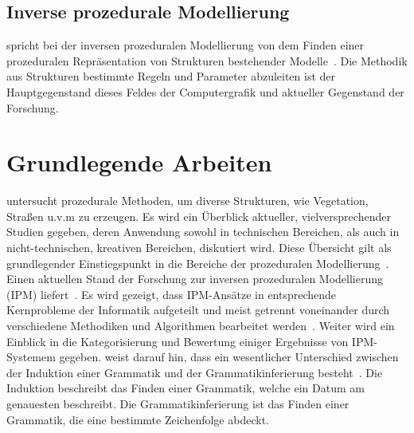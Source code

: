 \subsection*{Inverse prozedurale Modellierung}
\citeauthor{aliaga_2016} spricht bei der inversen prozeduralen Modellierung von dem Finden einer prozeduralen Repräsentation
von Strukturen bestehender Modelle~\cite{aliaga_2016}.
Die Methodik aus Strukturen bestimmte Regeln und Parameter abzuleiten ist der Hauptgegenstand dieses Feldes der
Computergrafik und aktueller Gegenstand der Forschung.

\section{Grundlegende Arbeiten}

\citeauthor{smelik_2014} untersucht prozedurale Methoden, um diverse Strukturen, wie Vegetation, Straßen u.v.m zu erzeugen.
Es wird ein Überblick aktueller, vielversprechender Studien gegeben, deren Anwendung sowohl in technischen Bereichen,
als auch in nicht-technischen, kreativen Bereichen, diskutiert wird.
Diese Übersicht gilt als grundlegender Einstiegspunkt in die Bereiche der prozeduralen
Modellierung~\cite{smelik_2014}.
Einen aktuellen Stand der Forschung zur inversen prozeduralen Modellierung (IPM) liefert~\citeauthor{aliaga_2016}.
Es wird gezeigt, dass IPM-Ansätze in entsprechende Kernprobleme der Informatik aufgeteilt und meist getrennt voneinander durch
verschiedene Methodiken und Algorithmen bearbeitet werden~\cite{aliaga_2016}.
Weiter wird ein Einblick in die Kategorisierung und Bewertung einiger Ergebnisse von IPM-Systemem gegeben.
\citeauthor{higuera_2010} weist darauf hin, dass ein wesentlicher Unterschied zwischen der Induktion einer Grammatik
und der Grammatikinferierung besteht~\cite{higuera_2010}.
Die Induktion beschreibt das Finden einer Grammatik, welche ein Datum am genauesten beschreibt.
Die Grammatikinferierung ist das Finden einer Grammatik, die eine bestimmte Zeichenfolge abdeckt.

\newpage

